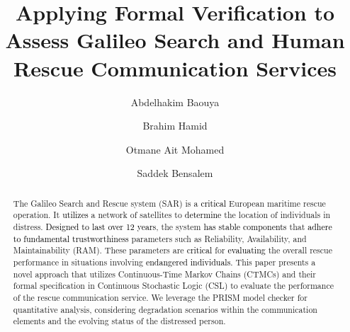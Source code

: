 \documentclass[runningheads]{llncs}
\newcommand{\cmt}[1] {\textcolor{black}{#1}}
\begin{document}
%
\title{Applying Formal Verification to Assess Galileo Search and Human Rescue Communication Services}
\author{Abdelhakim Baouya \and Brahim Hamid \and Otmane Ait Mohamed \and Saddek Bensalem }
%
\maketitle              %
%
\begin{abstract}
The Galileo Search and Rescue system (SAR) is a \cmt{critical} European maritime rescue operation. It \cmt{utilizes} a network of satellites to \cmt{determine} the location of individuals in distress. \cmt{Designed to last over 12 years}, the system \cmt{has stable components} that \cmt{adhere to fundamental trustworthiness} parameters such as Reliability, Availability, and Maintainability (RAM). These parameters are \cmt{critical} for \cmt{evaluating} the overall rescue performance in situations involving \cmt{endangered individuals.} This paper presents a novel approach that utilizes Continuous-Time Markov Chains (CTMCs) and their formal specification in Continuous Stochastic Logic (CSL) to evaluate the performance of the rescue communication service. We leverage the PRISM model checker for quantitative analysis, considering degradation scenarios within the communication elements and the evolving status of the distressed person. 


\end{abstract}
%
%
\end{document}
